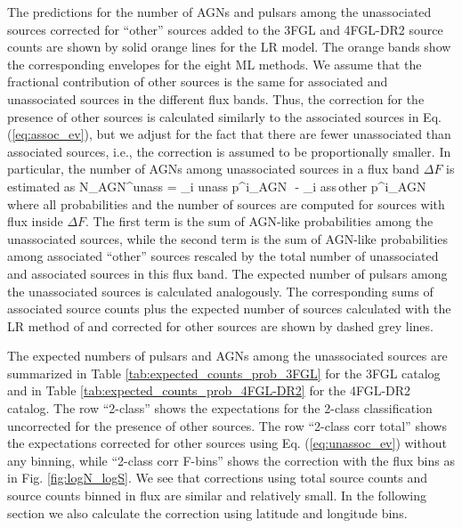 The predictions for the number of AGNs and pulsars among the unassociated sources corrected for ``other'' sources 
added to the 3FGL and 4FGL-DR2  source counts are shown by solid orange lines for the LR model.
The orange bands show the corresponding envelopes for the eight ML methods.
We assume that the fractional contribution of other sources is the same for associated and unassociated sources in the different flux bands.
Thus, the correction for the presence of other sources is calculated similarly to the associated sources in Eq. (\ref{eq:assoc_ev}),
but we adjust for the fact that there are fewer unassociated than associated sources, i.e., 
the correction is assumed to be proportionally smaller.
In particular, the number of AGNs among unassociated sources in a flux band $\Delta F$ is estimated as
\bea
{}
N_{\rm AGN}^{\rm unass} = \sum_{i \in \rm unass} p^i_{\rm AGN}\,\, - \sum_{i \in \rm ass\,other} p^i_{\rm AGN} \cdot 
{}
\eea
where all probabilities and the number of sources are computed for sources with flux inside $\Delta F$.
The first term is the sum of AGN-like probabilities among the unassociated sources,
while the second term is the sum of AGN-like probabilities among associated ``other'' sources rescaled by the total number
of unassociated and associated sources in this flux band.
The expected number of pulsars among the unassociated sources is calculated analogously.
The corresponding sums of associated source counts plus the expected number of sources calculated with the LR method of \cite{2016ApJ...820....8S} 
and corrected for other sources are shown by dashed grey lines.


The expected numbers of pulsars and AGNs among the unassociated sources
are summarized in Table \ref{tab:expected_counts_prob_3FGL} for the 3FGL catalog and 
in Table \ref{tab:expected_counts_prob_4FGL-DR2} for the 4FGL-DR2 catalog.
The row ``2-class'' shows the expectations for the 2-class classification uncorrected for the presence of other sources.
The row ``2-class corr total'' shows the expectations corrected for other sources using Eq. (\ref{eq:unassoc_ev}) without any binning,
while ``2-class corr F-bins'' shows the correction with the flux bins as in Fig. \ref{fig:logN_logS}.
We see that corrections using total source counts and source counts binned in flux are similar and relatively small.
In the following section we also calculate the correction using latitude and longitude bins.

